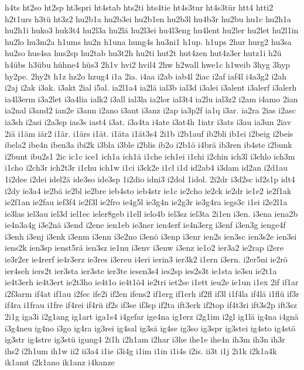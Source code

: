 {h4ts
ht2so
ht2sp
ht3spri
ht4stab
hts2ti
hts4tie
ht4s3tur
ht4s3tür
htt4
htti2
h2t1urs
h3tü
ht3z2
hu2b1a
hu2b3ei
hu2b1en
hu2b3l
hu4b3r
hu2bu
hu1c
hu2h1a
hu2h1i
huko3
huk3t4
hu2l3a
hu2lä
hu2l3ei
hu4l3eng
hu4lent
hu2ler
hu2let
hu2l1in
hu2lo
hu3m2a
h1ums
hu2n
h1una
hung4s
hu3ni1
h1up.
h1ups
2hur
hurg2
hu3sa
hu2so
hus4sa
hus2sp
hu2tab
hu3t2h
hu2ti
hut2t
hut4zen
hut4z3er
hutz1i
h2ü
h4übs
h3übu
hühne4
hüs3
2h1v
hvi2
hvil4
2hw
h2wall
hwe1c
h1weib
3hyg
3hyp
hy2pe.
2hy2t
h1z
hz2o
hzug4
i1a
2ia.
i4aa
i2ab
iab4l
2iac
i2af
iaf4l
i4a3g2
i2ah
i2aj
i2ak
i3ak.
i3akt
2ial
i5al.
ia2l1a4
ia2lä
ial3b
ial3d
i3alei
i3alent
i3alerf
i3alerh
ia4l3erm
i3a2let
i3a4lia
ialk2
i3all
ial3la
ia2lor
ial3t4
ia2lu
ial3z2
i2am
i4amo
2ian
ia2nal
i3and2
ian2e
i3ann
i2ano
i3ant
i3anz
i2ap
ia3p2f
ia1q
i3ar.
ia2ra
2ias
i2asc
ia3sh
i2asi
i2a3sp
ias3s
iast4
i3at.
i3a4ta
i4ate
i3at4h
1iatr
i3ats
i3au
ia3un
2iav
2iä
i1äm
iär2
i1är.
i1ärs
i1ät.
i1äta
i1ät3s4
2i1b
i2b1auf
ib2bli
ib1ei
i2beig
i2beis
ibela2
ibe4n
iben3a
ibi2k
i3bla
i3ble
i2blis
ib2o
i2b1ö
i4brä
ib3ren
ib4ste
i2bunk
i2bunt
ibu2s1
2ic
ic1c
ice1
ich1a
ich1ä
i1che
ich1ei
i1chi
i2chin
ich3l
i3chlo
ich3m
i1cho
i2ch3r
ich2t3r
i1chu
ich1w
i1ci
i3ck2e
i1cl
i1d
id2ab4
i3dam
id2an
i2d1au
1i2dee
i2dei
idel2ä
ide3so
ide3sp
1i2dio
idni3
i2dol
1idol.
2i2dr
i3d2sc
id2s1p
idt4
i2dy
ie3a4
ie2bä
ie2bl
ie2bre
ieb4sto
ieb4str
ie1c
ie2cho
ie2ck
ie2dr
ie1e2
ie2f1ak
ie2f1an
ie2fau
ief3f4
ie2f3l
ie2fro
ie4g5l
ie3g4n
ie2g3r
ie3g4ra
iegs3c
i1ei
i2e2l1a
ie3las
iel3au
iel3d
iel1ec
ieler8geb
i1ell
ielo4b
iel3sz
iel3ta
2i1en
i3en.
i3ena
iena2b
ie4n3a4g
i3e2nä
i3end
i2ene
ien1eb
ie3ner
ien4erf
ie4n3erg
i3enf
i3en3g
ienge4f
i3enh
i3enj
i3enk
i3enm
i3enn
i3e2no
i3enö
i3enp
i3enr
ien2s
ien3sc
ien3s2e
ien3si
iens2k
ien3sp
ienst5rä
ien3sz
ie1nu
i3env
i3enw
i3enz
ie1o2
ier3a2
ie2rap
i2ere
ie3r2er
ie4rerf
ie4r3erz
ie3res
i3ereu
i4eri
ierin3
ier3k2
i1ern
i3ern.
i2er5ni
ie2rö
ier4seh
iers2t
ier3sta
ier3ste
ier3te
iesen3s4
ies2sp
ies2s3t
ie1sta
ie3su
ie2t1a
ie4t3erh
ie4t3ert
ie2t3ho
ie4t1o
ie4t1ö4
ie2tri
iet2se
i1ett
ieu2e
ie1un
i1ex
2if
if1ar
i2f3arm
if4at
if1au
i2fec
ife2i
if2en
ifens2
if1erg
if1erh
if2fl
if3l
i1f4la
if4lä
i1flü
if3r
if4ra
i1frau
i1fre
if4rei
if4rü
if2s
if3se
if3sp
if2ta
ift3erk
if2top
if4t3ri
ift3s2p
ift3sz
2i1g
iga3i
i2g1ang
ig1art
iga1s4
i4gefar
ige4na
ig1erz
i2g1im
i2gl
ig1lä
ig4na
i4gnä
i3g4neu
ig4no
i3go
ig4ra
ig3rei
ig4sal
ig3sä
ig4se
ig3so
ig3spr
ig3stei
ig4sto
ig4stö
ig3str
ig4stre
ig3stü
igung4
2i1h
i2h1am
i2har
i3he
ihe1e
ihe4n
ih3m
ih3n
ih3r
ihs2
i2h1um
ih1w
ii2
ii3a4
i1ie
i3i4g
i1im
i1in
i1i4s
i2is.
ii3t
i1j
2i1k
i2k1a4k
ik1amt
i2k1ano
ik1anz
i4kanze
}
